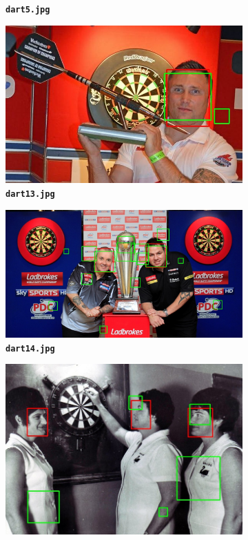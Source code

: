\documentclass[12pt]{article}
\begin{document}
\begin{figure}[htb]
\begin{subfigure}[b]{.48\linewidth}
  \caption{\textbf{\texttt{dart5.jpg}}}
\end{subfigure}
\begin{subfigure}[b]{.48\linewidth}
  \centering
  \includegraphics[width=\linewidth]{task1/result/dart13_detected.jpg}
  \caption{\textbf{\texttt{dart13.jpg}}}
\end{subfigure}
\begin{subfigure}[b]{.48\linewidth}
  \centering
  \includegraphics[width=\linewidth]{task1/result/dart14_detected.jpg}
  \caption{\textbf{\texttt{dart14.jpg}}}
\end{subfigure}
\begin{subfigure}[b]{.68\linewidth}
  \centering
  \includegraphics[width=\linewidth]{task1/result/dart15_detected.jpg}

\end{subfigure}
\end{figure}
\end{document}
